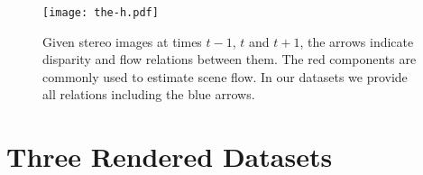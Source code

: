 \documentclass[10pt,twocolumn,letterpaper]{article}
\begin{document}





\begin{figure}[t]
\begin{center}
   \texttt{[image: the-h.pdf]}
\end{center}
   \caption{Given stereo images at times $t\!-\!1$, $t$ and $t\!+\!1$, the arrows indicate disparity and flow relations between them. The red components are commonly used to estimate scene flow. In our datasets we provide all relations including the blue arrows.}
\label{fig:the-h}
\end{figure}



\section{Three Rendered Datasets}\label{sec:datasets}


\end{document}
